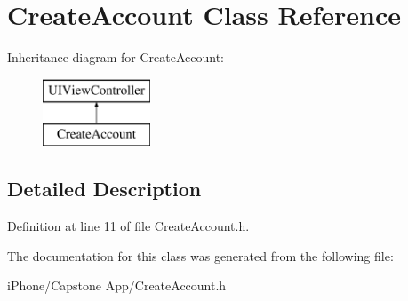 \hypertarget{interface_create_account}{\section{Create\-Account Class Reference}
\label{interface_create_account}
}
Inheritance diagram for Create\-Account\-:\begin{figure}[H]
\begin{center}
\leavevmode
\includegraphics[height=2.000000cm]{interface_create_account}
\end{center}
\end{figure}


\subsection{Detailed Description}


Definition at line 11 of file Create\-Account.\-h.



The documentation for this class was generated from the following file\-:\begin{DoxyCompactItemize}
\item 
i\-Phone/\-Capstone App/Create\-Account.\-h\end{DoxyCompactItemize}
